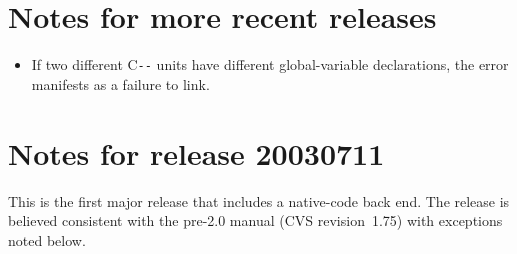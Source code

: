 \documentclass{article}
\def\PAL{\mbox{C{\texttt{-{}-}}}}
\begin{document}
\section{Notes for more recent releases}

\begin{itemize}
\item
If two different {\PAL} units have different global-variable
declarations, the error manifests as a failure to link.
\end{itemize}


\section{Notes for release 20030711}


This is the first major release that includes a native-code back end.
The release is believed consistent with the pre-2.0 manual (CVS
revision~1.75) with exceptions noted below.
\end{document}
